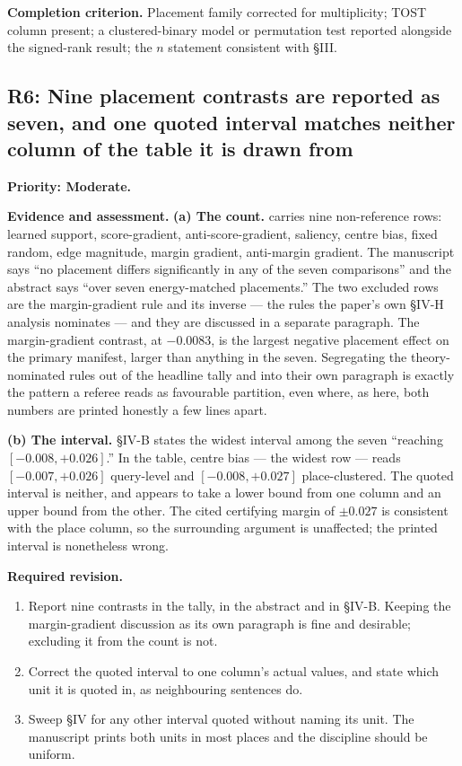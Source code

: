 \documentclass[11pt,a4paper]{article}
\newcommand{\finding}[3]{\subsection{#1: #3}\label{rev:#1}\textbf{Priority: #2.}}
\newcommand{\file}[1]{\path{#1}}
\newcommand{\evidence}{\par\textbf{Evidence and assessment.} }
\newcommand{\action}{\par\textbf{Required revision.} }
\newcommand{\acceptance}{\par\textbf{Completion criterion.} }
\begin{document}
\acceptance
Placement family corrected for multiplicity; TOST column present; a
clustered-binary model or permutation test reported alongside the signed-rank
result; the $n$ statement consistent with \S III.

\finding{R6}{Moderate}{Nine placement contrasts are reported as seven, and one
quoted interval matches neither column of the table it is drawn from}

\evidence
\textbf{(a) The count.} \file{tab\_placement\_msls.tex} carries nine non-reference
rows: learned support, score-gradient, anti-score-gradient, saliency, centre
bias, fixed random, edge magnitude, margin gradient, anti-margin gradient. The
manuscript says ``no placement differs significantly in any of the seven
comparisons'' and the abstract says ``over seven energy-matched placements.''
The two excluded rows are the margin-gradient rule and its inverse --- the rules
the paper's own \S IV-H analysis nominates --- and they are discussed in a
separate paragraph. The margin-gradient contrast, at $-0.0083$, is the largest
negative placement effect on the primary manifest, larger than anything in the
seven. Segregating the theory-nominated rules out of the headline tally and
into their own paragraph is exactly the pattern a referee reads as favourable
partition, even where, as here, both numbers are printed honestly a few lines
apart.

\textbf{(b) The interval.} \S IV-B states the widest interval among the seven
``reaching $[-0.008,+0.026]$.'' In the table, centre bias --- the widest row ---
reads $[-0.007,+0.026]$ query-level and $[-0.008,+0.027]$ place-clustered. The
quoted interval is neither, and appears to take a lower bound from one column
and an upper bound from the other. The cited certifying margin of $\pm0.027$ is
consistent with the place column, so the surrounding argument is unaffected;
the printed interval is nonetheless wrong.

\action
\begin{enumerate}
\item Report nine contrasts in the tally, in the abstract and in \S IV-B.
  Keeping the margin-gradient discussion as its own paragraph is fine and
  desirable; excluding it from the count is not.
\item Correct the quoted interval to one column's actual values, and state
  which unit it is quoted in, as neighbouring sentences do.
\item Sweep \S IV for any other interval quoted without naming its unit. The
  manuscript prints both units in most places and the discipline should be
  uniform.
\end{enumerate}
\end{document}
